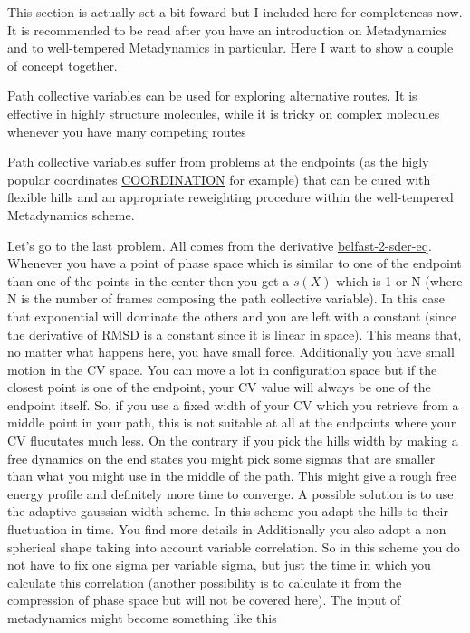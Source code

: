 This section is actually set a bit foward but I included here for completeness now. It is recommended to be read after you have an introduction on Metadynamics and to well-\/tempered Metadynamics in particular. Here I want to show a couple of concept together.
\begin{DoxyItemize}
\item Path collective variables can be used for exploring alternative routes. It is effective in highly structure molecules, while it is tricky on complex molecules whenever you have many competing routes
\item Path collective variables suffer from problems at the endpoints (as the higly popular coordinates \hyperlink{COORDINATION}{C\+O\+O\+R\+D\+I\+N\+A\+T\+I\+O\+N} for example) that can be cured with flexible hills and an appropriate reweighting procedure within the well-\/tempered Metadynamics scheme.
\end{DoxyItemize}

Let's go to the last problem. All comes from the derivative \hyperlink{belfast-2_belfast-2-sder-eq}{belfast-\/2-\/sder-\/eq}. Whenever you have a point of phase space which is similar to one of the endpoint than one of the points in the center then you get a $ s(X) $ which is 1 or N (where N is the number of frames composing the path collective variable). In this case that exponential will dominate the others and you are left with a constant (since the derivative of R\+M\+S\+D is a constant since it is linear in space). This means that, no matter what happens here, you have small force. Additionally you have small motion in the C\+V space. You can move a lot in configuration space but if the closest point is one of the endpoint, your C\+V value will always be one of the endpoint itself. So, if you use a fixed width of your C\+V which you retrieve from a middle point in your path, this is not suitable at all at the endpoints where your C\+V flucutates much less. On the contrary if you pick the hills width by making a free dynamics on the end states you might pick some sigmas that are smaller than what you might use in the middle of the path. This might give a rough free energy profile and definitely more time to converge. A possible solution is to use the adaptive gaussian width scheme. In this scheme you adapt the hills to their fluctuation in time. You find more details in \cite{Branduardi:2012dl} Additionally you also adopt a non spherical shape taking into account variable correlation. So in this scheme you do not have to fix one sigma per variable sigma, but just the time in which you calculate this correlation (another possibility is to calculate it from the compression of phase space but will not be covered here). The input of metadynamics might become something like this

